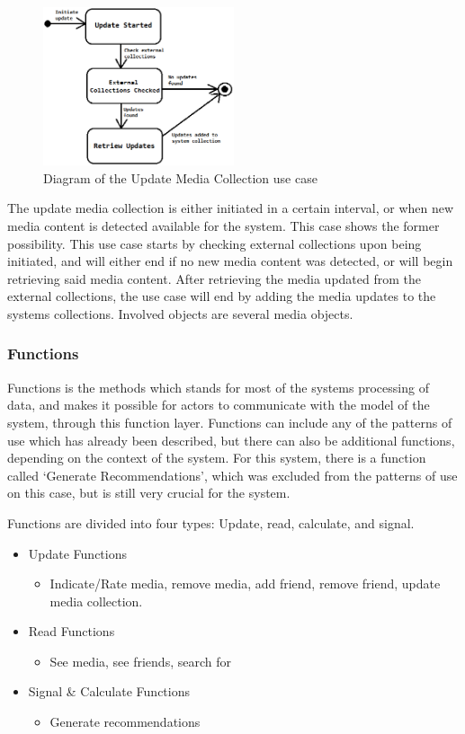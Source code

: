 \begin{figure}[htb]
\centering
\includegraphics[width=0.5\textwidth]{Images/UpdateCollection.png}
\caption{Diagram of the Update Media Collection use case}
\label{UpdateCollection}
\end{figure}

The update media collection is either initiated in a certain interval, or when new media content is detected available for the system. This case shows the former possibility. This use case starts by checking external collections upon being initiated, and will either end if no new media content was detected, or will begin retrieving said media content. After retrieving the media updated from the external collections, the use case will end by adding the media updates to the systems collections. Involved objects are several media objects.

\subsubsection{Functions}

Functions is the methods which stands for most of the systems processing of data, and makes it possible for actors to communicate with the model of the system, through this function layer. Functions can include any of the patterns of use which has already been described, but there can also be additional functions, depending on the context of the system. For this system, there is a function called ‘Generate Recommendations’, which was excluded from the patterns of use on this case, but is still very crucial for the system. 

Functions are divided into four types: Update, read, calculate, and signal.
\begin{itemize}
	\item Update Functions
	\begin{itemize}
		\item Indicate/Rate media, remove media, add friend, remove friend, update media collection.
	\end{itemize}
	\item Read Functions
	\begin{itemize}
		\item See media, see friends, search for
	\end{itemize}
	\item Signal \& Calculate Functions
	\begin{itemize}
		\item Generate recommendations
	\end{itemize}
\end{itemize}

